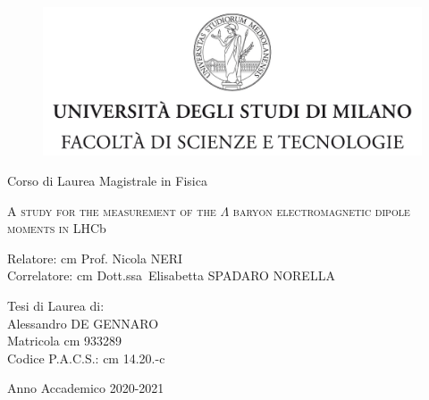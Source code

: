 

\begin{titlepage}
	\begin{figure}[t]
		\centering
		\includegraphics[width=390pt]{graphics/cover-page/logo.jpg}
		\centering
	\end{figure}	
\begin{center}
{\large Corso di Laurea Magistrale in Fisica}
\end{center}

\begin{center}
\vspace{2 cm}
{\Large \textsc{A study for the measurement of the $\Lambda$ baryon electromagnetic
dipole moments in LHC}b\par}
\end{center}
  \vspace{2 cm}
  
  \begin{flushleft}
  		 Relatore:  cm Prof. Nicola NERI\\
		 
  		 \noindent Correlatore:  cm Dott.ssa\ Elisabetta SPADARO NORELLA
  \end{flushleft}
  \vspace{1 cm}
  \begin{flushright}
  	Tesi di Laurea di:\\ Alessandro DE GENNARO\\ Matricola  cm 933289\\ Codice P.A.C.S.:  cm 14.20.-c
  \end{flushright}
    	  
\begin{center}
\vspace{2 cm}
{\large Anno Accademico 2020-2021}
\end{center}
\end{titlepage}